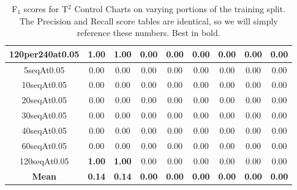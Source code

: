 \documentclass[12pt]{article}
\begin{document}
\begin{table}[]
\begin{tabular}{|c|cc|cc|cc|cc|}
        120per240at0.05 & \textbf{1.00}               & \textbf{1.00}              & 0.00                        & 0.00                       & 0.00                        & 0.00                       & 0.00                        & 0.00                       \\ \hline
        5seqAt0.05      & 0.00                        & 0.00                       & 0.00                        & 0.00                       & 0.00                        & 0.00                       & 0.00                        & 0.00                       \\
        10seqAt0.05     & 0.00                        & 0.00                       & 0.00                        & 0.00                       & 0.00                        & 0.00                       & 0.00                        & 0.00                       \\
        20seqAt0.05     & 0.00                        & 0.00                       & 0.00                        & 0.00                       & 0.00                        & 0.00                       & 0.00                        & 0.00                       \\
        30seqAt0.05     & 0.00                        & 0.00                       & 0.00                        & 0.00                       & 0.00                        & 0.00                       & 0.00                        & 0.00                       \\
        40seqAt0.05     & 0.00                        & 0.00                       & 0.00                        & 0.00                       & 0.00                        & 0.00                       & 0.00                        & 0.00                       \\
        60seqAt0.05     & 0.00                        & 0.00                       & 0.00                        & 0.00                       & 0.00                        & 0.00                       & 0.00                        & 0.00                       \\
        120seqAt0.05    & \textbf{1.00}               & \textbf{1.00}              & 0.00                        & 0.00                       & 0.00                        & 0.00                       & 0.00                        & 0.00                       \\ \hline
        \textbf{Mean}   & \textbf{0.14}               & \textbf{0.14}              & \textbf{0.00}               & \textbf{0.00}              & \textbf{0.00}               & \textbf{0.00}              & \textbf{0.00}               & \textbf{0.00}              \\ \hline
    \end{tabular}
    \caption{F$_1$ scores for T$^2$ Control Charts on varying portions of the training split. The Precision and Recall score tables are identical, so we will simply reference these numbers. Best in bold.}
\end{table}
\end{document}
